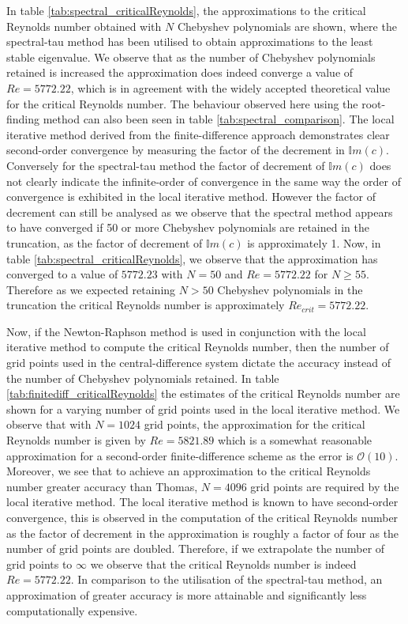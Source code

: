 \documentclass[a4paper, 12pt, twoside, openright]{article}
\numberwithin{equation}{section}
\begin{document}
In table \ref{tab:spectral_criticalReynolds}, the approximations to the critical Reynolds number obtained with $N$ Chebyshev polynomials are shown, where the spectral-tau method has been utilised to obtain approximations to the least stable eigenvalue. We observe that as the number of Chebyshev polynomials retained is increased the approximation does indeed converge a value of $Re=5772.22$, which is in agreement with the widely accepted theoretical value for the critical Reynolds number. The behaviour observed here using the root-finding method can also been seen in table \ref{tab:spectral_comparison}. The local iterative method derived from the finite-difference approach demonstrates clear second-order convergence by measuring the factor of the decrement in $\mathbb{I}m(c)$. Conversely for the spectral-tau method the factor of decrement of $\mathbb{I}m(c)$ does not clearly indicate the infinite-order of convergence in the same way the order of convergence is exhibited in the local iterative method. However the factor of decrement can still be analysed as we observe that the spectral method appears to have converged if 50 or more Chebyshev polynomials are retained in the truncation, as the factor of decrement of $\mathbb{I}m(c)$ is approximately 1. Now, in table \ref{tab:spectral_criticalReynolds}, we observe that the approximation has converged to a value of $5772.23$ with $N=50$ and $Re=5772.22$ for $N\geq55$. Therefore as we expected retaining $N>50$ Chebyshev polynomials in the truncation the critical Reynolds number is approximately $Re_{crit}=5772.22$. %

Now, if the Newton-Raphson method is used in conjunction with the local iterative method to compute the critical Reynolds number, then the number of grid points used in the central-difference system dictate the accuracy instead of the number of Chebyshev polynomials retained. In table \ref{tab:finitediff_criticalReynolds} the estimates of the critical Reynolds number are shown for a varying number of grid points used in the local iterative method. We observe that with $N=1024$ grid points, the approximation for the critical Reynolds number is given by $Re=5821.89$ which is a somewhat reasonable approximation for a second-order finite-difference scheme as the error is $\mathcal{O}(10)$. Moreover, we see that to achieve an approximation to the critical Reynolds number greater accuracy than Thomas, $N=4096$ grid points are required by the local iterative method. The local iterative method is known to have second-order convergence, this is observed in the computation of the critical Reynolds number as the factor of decrement in the approximation is roughly a factor of four as the number of grid points are doubled. Therefore, if we extrapolate the number of grid points to $\infty$ we observe that the critical Reynolds number is indeed $Re=5772.22$. In comparison to the utilisation of the spectral-tau method, an approximation of greater accuracy is more attainable and significantly less computationally expensive. %
\end{document}
